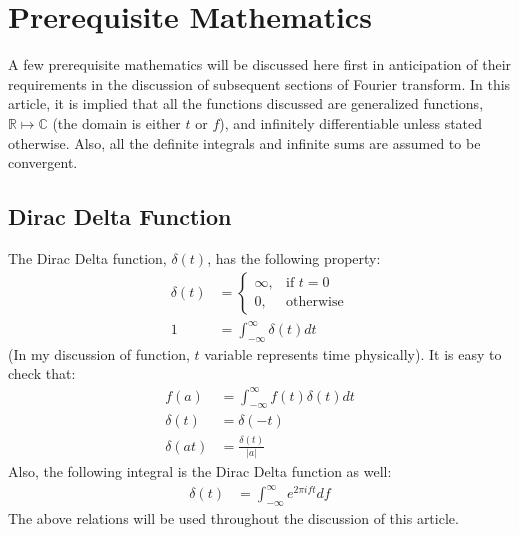 \documentclass[letterpaper, 11pt]{article}
\newcommand{\fint}{\int_{-\infty}^{\infty}} %
\newcommand{\ift}[3]{\fint #2 e^{2\pi i#1#3} d#1} %
\numberwithin{equation}{section}
\numberwithin{figure}{section}
\begin{document}
\section{Prerequisite Mathematics}
A few prerequisite mathematics will be discussed here first in anticipation of their requirements in the discussion of subsequent sections of Fourier transform. In this article, it is implied that all the functions discussed are generalized functions, \(\mathbb{R} \mapsto \mathbb{C} \) (the domain is either \(t\) or \(f\)), and infinitely differentiable unless stated otherwise. Also, all the definite integrals and infinite sums are assumed to be convergent.  

\subsection{Dirac Delta Function}
The Dirac Delta function, \(\delta (t)\), has the following property:
\begin{align}
	\delta (t)	&=\begin{cases}
		\infty, & \text{if } t = 0 \\
		0,	& \text{otherwise}
	\end{cases}\\
		1	&= \fint \delta (t) dt
\end{align}
(In my discussion of function, \(t\) variable represents time physically). It is easy to check that:
\begin{align}
	f(a)		&= \fint f(t) \delta (t) dt\\
	\delta (t)	&= \delta (-t)\\
	\delta (at)	&= \frac{\delta (t)}{|a|}
\end{align}
Also, the following integral is the Dirac Delta function as well:
\begin{align}
	\delta (t)	&= \ift{f}{}{t}
	\label{eq:dirac}
\end{align}
The above relations will be used throughout the discussion of this article.

\end{document}
